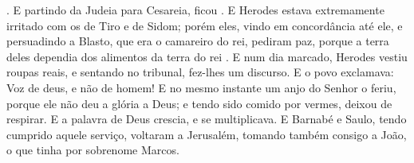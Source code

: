 {{} . E partindo da Judeia para Cesareia, ficou
{} .
  E Herodes estava extremamente irritado com os de Tiro e de Sidom; porém eles, vindo em concordância até ele, e persuadindo a Blasto, que era o camareiro do rei, pediram paz, porque a terra deles dependia dos alimentos da terra do rei
{} .
  E num dia marcado, Herodes vestiu roupas reais, e sentando no tribunal, fez-lhes um discurso.
  E o povo exclamava: Voz de deus, e não de homem!
  E no mesmo instante um anjo do Senhor o feriu, porque ele não deu a glória a Deus; e tendo sido comido por vermes, deixou de respirar.
  E a palavra de Deus crescia, e se multiplicava.
  E Barnabé e Saulo, tendo cumprido aquele serviço, voltaram a Jerusalém, tomando também consigo a João, o que tinha por sobrenome Marcos.
\par }

